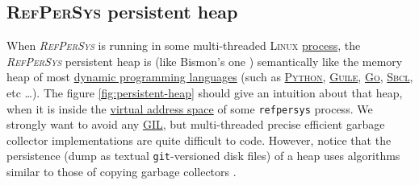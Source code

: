 \documentclass[11pt,a4paper,svgnames]{article}
\newcommand{\RefPerSys}{{\textit{\textsc{RefPerSys}}}}
\begin{document}
\bigskip

\subsection{\textsc{RefPerSys} persistent heap}
\label{subsec:persistheap}

When {\RefPerSys} is running in some multi-threaded \textsc{Linux}
\href{https://en.wikipedia.org/wiki/Process\_(computing)}{process},
the {\RefPerSys} persistent heap is (like Bismon's one
\cite{Starynkevitch:2019:bismon-draft}) semantically like the memory
heap of most
\href{https://en.wikipedia.org/wiki/Dynamic\_programming\_language}{dynamic
  programming languages} (such as
\href{https://python.org/}{\textsc{Python}},
\href{https://www.gnu.org/software/guile/}{\textsc{Guile}},
\href{https://golang.org/}{\textsc{Go}},
\href{http://sbcl.org/}{\textsc{Sbcl}}, etc \ldots). The
figure \ref{fig:persistent-heap} should give an intuition about that
heap, when it is inside the
\href{https://en.wikipedia.org/wiki/Virtual_address_space}{virtual
  address space} of some \texttt{refpersys} process. We strongly want
to avoid any
\href{https://en.wikipedia.org/wiki/Global\_interpreter\_lock}{GIL},
but multi-threaded precise efficient garbage collector implementations
are quite difficult to code. However, notice that the persistence
(dump as textual \texttt{git}-versioned disk files) of a heap uses
algorithms similar to those of copying garbage collectors
\cite{wilson:1992:uniprocessorgc, jones:2016:gchandbook}.
\end{document}
